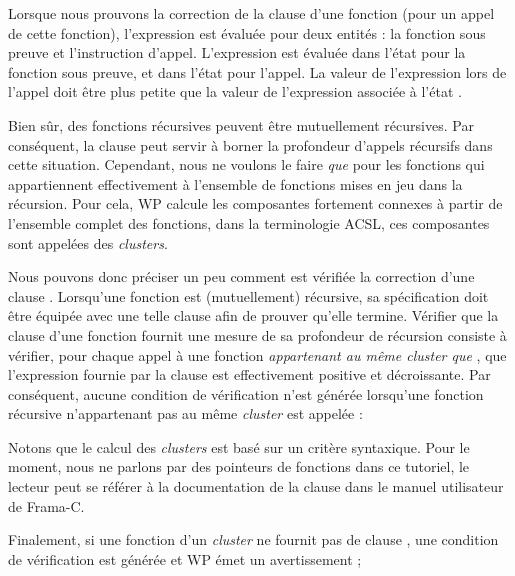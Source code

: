 Lorsque nous prouvons la correction de la clause
 d'une fonction (pour un appel de cette fonction),
l'expression est évaluée pour deux entités : la fonction sous preuve et
l'instruction d'appel. L'expression est évaluée dans l'état 
pour la fonction sous preuve, et dans l'état  pour l'appel.
La valeur de l'expression lors de l'appel doit être plus petite que la valeur
de l'expression associée à l'état .




Bien sûr, des fonctions récursives peuvent être mutuellement récursives. Par
conséquent, la clause  peut servir à borner la
profondeur d'appels récursifs dans cette situation. Cependant, nous ne voulons
le faire \textit{que} pour les fonctions qui appartiennent effectivement à
l'ensemble de fonctions mises en jeu dans la récursion. Pour cela, WP calcule
les composantes fortement connexes à partir de l'ensemble complet des fonctions,
dans la terminologie ACSL, ces composantes sont appelées des \textit{clusters}.


Nous pouvons donc préciser un peu comment est vérifiée la correction d'une clause
. Lorsqu'une fonction est (mutuellement) récursive, sa
spécification doit être équipée avec une telle clause afin de prouver qu'elle
termine. Vérifier que la clause  d'une fonction
 fournit une mesure de sa profondeur de récursion consiste à vérifier,
pour chaque appel à une fonction \textit{appartenant au même cluster que
}, que l'expression fournie par la clause est effectivement positive
et décroissante. Par conséquent, aucune condition de vérification n'est
générée lorsqu'une fonction récursive n'appartenant pas au même \textit{cluster}
est appelée :




\begin{Information}
  Notons que le calcul des \textit{clusters} est basé sur un critère syntaxique.
  Pour le moment, nous ne parlons par des pointeurs de fonctions dans ce tutoriel,
  le lecteur peut se référer à la documentation de la clause 
  dans le manuel utilisateur de Frama-C.
\end{Information}


Finalement, si une fonction d'un \textit{cluster} ne fournit pas de clause
, une condition de vérification
 est générée et WP émet un avertissement ;


